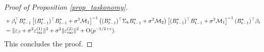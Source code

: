 \begin{proof}[Proof of Proposition \ref{prop_taskonomy}]
\begin{align*}
&+ \beta_t^\top B_{t-1}^\star \left[(B_{t-1}^{\star})^\top B_{t-1}^{\star} +\sigma^2\mathcal M_1\right]^{-1} \left((B_{t-1}^{\star})^\top \Sigma_k B_{t-1}^{\star}+\sigma^2 {\mathcal M}_2 \right) \left[(B_{t-1}^{\star})^\top B_{t-1}^{\star} +\sigma^2\mathcal M_1\right]^{-1}  (B_{t-1}^{\star})^\top \beta_t \\
& =\|{\varepsilon}_\beta + \sigma^2 {\varepsilon}_{\text{var}}^{(1)}\|^2+ \sigma^2 \|{\varepsilon}_{\text{var}}^{(2)}\|^2 + \operatorname{O}(p^{-1/2+{\varepsilon}}).
\end{align*}
This concludes the proof.
\end{proof}

